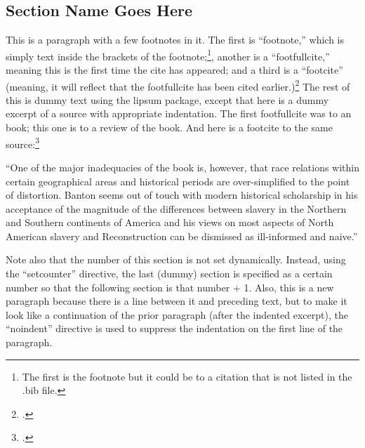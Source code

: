 \documentclass{article}
\begin{document}
\begin{spacing}{1.35}

\setcounter{section}{6}  %
\section{Section Name Goes Here}
\pagestyle{plain}

 This is a paragraph with a few footnotes in it. The first is ``footnote,'' which is simply text inside the brackets of the footnote;\footnote{The first is the footnote but it could be to a citation that is not listed in the .bib file.}, another is a 
``footfullcite,'' meaning this is the first time the cite has appeared; and a third is a ``footcite'' (meaning, it will reflect that the footfullcite has been cited earlier.)\footcite[][p. 194]{Banton-1983} The rest of this is dummy text using the lipsum package, except that here is a dummy excerpt of a source with appropriate indentation. The first footfullcite was to an book; this one is to a review of the book. And here is a footcite to the same source:\footcite[][p. 304]{Ellison-1985}

\begin{adjustwidth}{.65cm}{.5cm}
  \begin{singlespace}
  ``One of the major inadequacies of the book is, however, that race relations within certain geographical areas and historical periods are over-simplified to the point of distortion. Banton seems out of touch with modern historical scholarship in his acceptance of the magnitude of the differences between slavery in the Northern and Southern continents of America and his views on most aspects of North American slavery and Reconstruction can be dismissed as ill-informed and naive.''
  \end{singlespace}
  \end{adjustwidth}

\noindent
Note also that the number of this section is not set dynamically. Instead, using the ``setcounter'' directive, the last (dummy) section is specified as a certain number so that the following section is that number + 1. Also, this is a new paragraph because there is a line between it and preceding text, but to make it look like a continuation of the prior paragraph (after the indented excerpt), the ``noindent'' directive is used to suppress the indentation on the first line of the paragraph.


\end{spacing}
\end{document}
